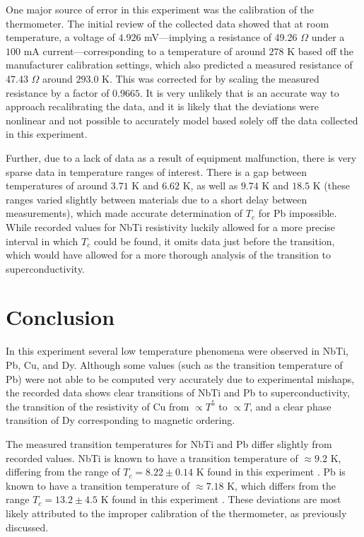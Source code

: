 \documentclass[prl,twocolumn,superscriptaddress,floatfix]{revtex4}
\begin{document}
One major source of error in this experiment was the calibration of the thermometer. The initial review of the collected data showed that at room temperature, a voltage of $4.926$ mV---implying a resistance of 49.26 $\Omega$ under a $100$ mA current---corresponding to a temperature of around $278$ K based off the manufacturer calibration settings, which also  predicted a measured resistance of 47.43 $\Omega$ around $293.0$ K. This was corrected for by scaling the measured resistance by a factor of $0.9665$. It is very unlikely that is an accurate way to approach recalibrating the data, and it is likely that the deviations were nonlinear and not possible to accurately model based solely off the data collected in this experiment.

Further, due to a lack of data as a result of equipment malfunction, there is very sparse data in temperature ranges of interest. There is a gap between temperatures of around $3.71$ K and $6.62$ K, as well as $9.74$ K and $18.5$ K (these ranges varied slightly between materials due to a short delay between measurements), which made accurate determination of $T_c$ for Pb impossible. While recorded values for NbTi resistivity luckily allowed for a more precise interval in which $T_c$ could be found, it omits data just before the transition, which would have allowed for a more thorough analysis of the transition to superconductivity.

\section{Conclusion}
In this experiment several  low temperature phenomena were observed in NbTi, Pb, Cu, and Dy. 
Although some values (such as the transition temperature of Pb) were not able to be computed very accurately due to experimental mishaps, the recorded data shows clear transitions of NbTi and Pb to superconductivity, the transition of the resistivity of Cu from $\propto T^5$ to $\propto T$, and a clear phase transition of Dy corresponding to magnetic ordering.

The measured transition temperatures for NbTi and Pb differ slightly from recorded values. NbTi is known to have a transition temperature of $\approx 9.2$ K, differing from the range of $T_c=8.22 \pm 0.14$ K found in this experiment \cite{1062311}.
Pb is known to have a transition temperature of $\approx 7.18$ K, which differs from the range $T_c=13.2 \pm 4.5$ K found in this experiment \cite{PhysRev.109.1094}. These deviations are most likely attributed to the improper calibration of the thermometer, as previously discussed.
\end{document}
